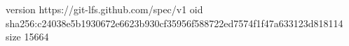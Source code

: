 version https://git-lfs.github.com/spec/v1
oid sha256:c24038e5b1930672e6623b930cf35956f588722ed7574f1f47a633123d818114
size 15664
